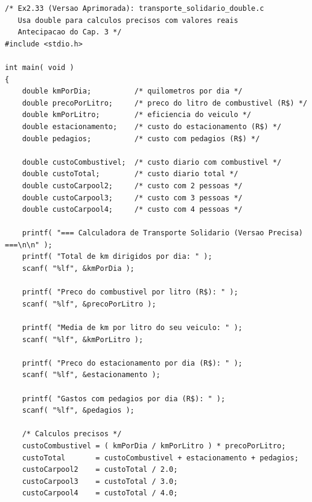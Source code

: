 \documentclass[12pt,a4paper]{article}
\begin{document}
\begin{respostabox}
\begin{lstlisting}
/* Ex2.33 (Versao Aprimorada): transporte_solidario_double.c
   Usa double para calculos precisos com valores reais
   Antecipacao do Cap. 3 */
#include <stdio.h>

int main( void )
{
    double kmPorDia;          /* quilometros por dia */
    double precoPorLitro;     /* preco do litro de combustivel (R$) */
    double kmPorLitro;        /* eficiencia do veiculo */
    double estacionamento;    /* custo do estacionamento (R$) */
    double pedagios;          /* custo com pedagios (R$) */

    double custoCombustivel;  /* custo diario com combustivel */
    double custoTotal;        /* custo diario total */
    double custoCarpool2;     /* custo com 2 pessoas */
    double custoCarpool3;     /* custo com 3 pessoas */
    double custoCarpool4;     /* custo com 4 pessoas */

    printf( "=== Calculadora de Transporte Solidario (Versao Precisa) ===\n\n" );
    printf( "Total de km dirigidos por dia: " );
    scanf( "%lf", &kmPorDia );

    printf( "Preco do combustivel por litro (R$): " );
    scanf( "%lf", &precoPorLitro );

    printf( "Media de km por litro do seu veiculo: " );
    scanf( "%lf", &kmPorLitro );

    printf( "Preco do estacionamento por dia (R$): " );
    scanf( "%lf", &estacionamento );

    printf( "Gastos com pedagios por dia (R$): " );
    scanf( "%lf", &pedagios );

    /* Calculos precisos */
    custoCombustivel = ( kmPorDia / kmPorLitro ) * precoPorLitro;
    custoTotal       = custoCombustivel + estacionamento + pedagios;
    custoCarpool2    = custoTotal / 2.0;
    custoCarpool3    = custoTotal / 3.0;
    custoCarpool4    = custoTotal / 4.0;


\end{lstlisting}
\end{respostabox}
\end{document}
